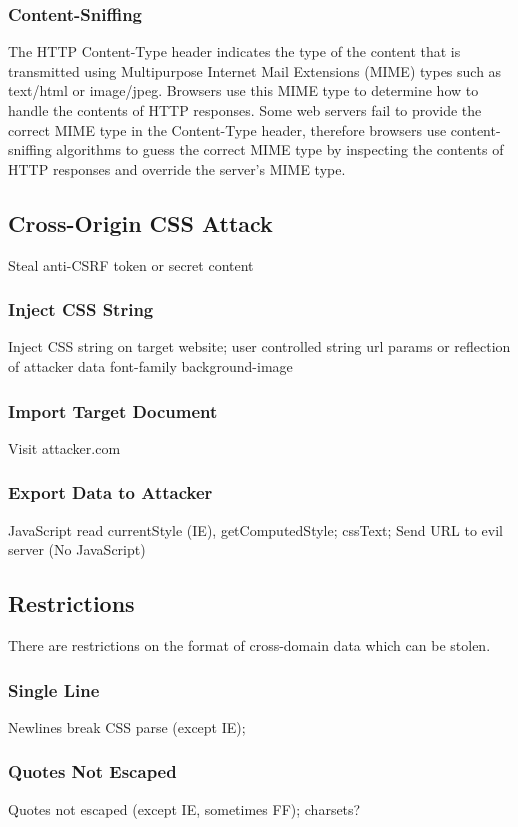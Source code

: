 \documentclass{acm_proc_article-sp}
\begin{document}
\subsubsection{Content-Sniffing}
The HTTP Content-Type header indicates the type of the content that is transmitted using Multipurpose Internet Mail Extensions (MIME)\cite{mime} types such as text/html or image/jpeg. Browsers use this MIME type to determine how to handle the contents of HTTP responses. Some web servers fail to provide the correct MIME type in the Content-Type header, therefore browsers use content-sniffing algorithms to guess the correct MIME type by inspecting the contents of HTTP responses and override the server's MIME type. 

\subsection{Cross-Origin CSS Attack}
Steal anti-CSRF token or secret content

\subsubsection{Inject CSS String}
Inject CSS string on target website;
user controlled string
url params or reflection of attacker data
font-family
background-image

\subsubsection{Import Target Document}
Visit attacker.com

\subsubsection{Export Data to Attacker}
JavaScript read currentStyle (IE), getComputedStyle;
cssText;
Send URL to evil server (No JavaScript)

\subsection{Restrictions}
There are restrictions on the format of cross-domain data which can be stolen.

\subsubsection{Single Line}
Newlines break CSS parse (except IE);

\subsubsection{Quotes Not Escaped}
Quotes not escaped (except IE, sometimes FF);
charsets?
\end{document}
